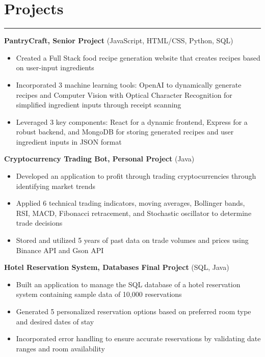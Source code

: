 \documentclass[a4paper,10pt]{article}
\begin{document}
\section*{Projects}
\vspace{-18pt}
\noindent\rule{\textwidth}{0.4pt}
\vspace{5pt}
\textbf{PantryCraft, Senior Project} (JavaScript, HTML/CSS, Python, SQL) \\
\begin{itemize}[leftmargin=*,label=\textbullet]
  \item Created a Full Stack food recipe generation website that creates recipes based on user-input ingredients
  \item Incorporated 3 machine learning tools: OpenAI to dynamically generate recipes and Computer Vision with Optical Character Recognition for simplified ingredient inputs through receipt scanning
  \item Leveraged 3 key components: React for a dynamic frontend, Express for a robust backend, and MongoDB for storing generated recipes and user ingredient inputs in JSON format
\end{itemize}
\vspace{10pt}
\textbf{Cryptocurrency Trading Bot, Personal Project} (Java) \\
\begin{itemize}[leftmargin=*,label=\textbullet]
  \item Developed an application to profit through trading cryptocurrencies through identifying market trends
  \item Applied 6 technical trading indicators, moving averages, Bollinger bands, RSI, MACD, Fibonacci retracement, and Stochastic oscillator to determine trade decisions
  \item Stored and utilized 5 years of past data on trade volumes and prices using Binance API and Gson API
\end{itemize}
\vspace{10pt}
\textbf{Hotel Reservation System, Databases Final Project} (SQL, Java) \\
\begin{itemize}[leftmargin=*,label=\textbullet]
  \item Built an application to manage the SQL database of a hotel reservation system containing sample data of 10,000 reservations
  \item Generated 5 personalized reservation options based on preferred room type and desired dates of stay
  \item Incorporated error handling to ensure accurate reservations by validating date ranges and room availability
\end{itemize}
\vspace{10pt}
\end{document}
